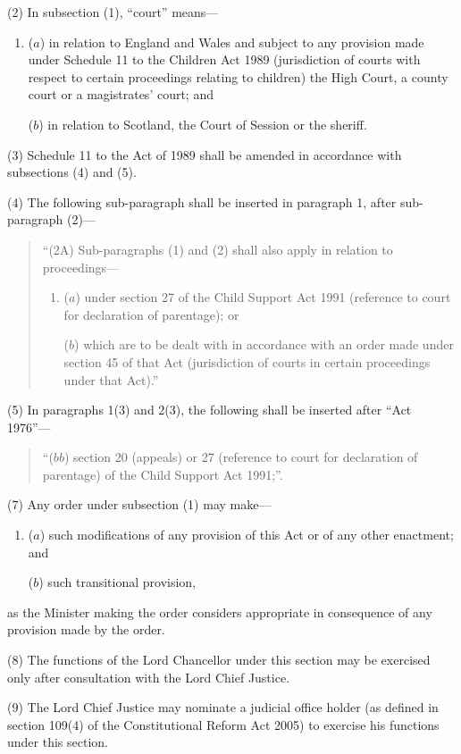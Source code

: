 \documentclass[a4paper]{article}
\begin{document}
(2) In subsection (1), “court” means---
\begin{enumerate}\item[]
($a$) in relation to England and Wales and subject to any provision made under Schedule 11 to the Children Act 1989 (jurisdiction of courts with respect to certain proceedings relating to children) the High Court, a county court or a magistrates’ court; and

($b$) in relation to Scotland, the Court of Session or the sheriff.
\end{enumerate}

(3)
Schedule 11 to the Act of 1989 shall be amended in accordance with subsections (4) and (5).

(4)
The following sub-paragraph shall be inserted in paragraph 1, after sub-paragraph (2)---
\begin{quotation}
 “(2A) Sub-paragraphs (1) and (2) shall also apply in relation to proceedings---
\begin{enumerate}\item[]
($a$)
under section 27 of the Child Support Act 1991 (reference to court for declaration of parentage); or

($b$)
which are to be dealt with in accordance with an order made under section 45 of that Act (jurisdiction of courts in certain proceedings under that Act).”
\end{enumerate}
\end{quotation}

(5)
In paragraphs 1(3) and 2(3), the following shall be inserted after “Act 1976”---
\begin{quotation}
“($bb$) section 20 (appeals) or 27 (reference to court for declaration of parentage) of the Child Support Act 1991;”.
\end{quotation}

(7)
Any order under subsection (1) may make---
\begin{enumerate}\item[]
($a$) such modifications of any provision of this Act or of any other enactment; and

($b$) such transitional provision,
\end{enumerate}
as the Minister making the order considers appropriate in consequence of any provision made by the order.

(8) The functions of the Lord Chancellor under this section may be exercised only after consultation with the Lord Chief Justice.

(9) The Lord Chief Justice may nominate a judicial office holder (as defined in section 109(4) of the Constitutional Reform Act 2005) to exercise his functions under this section.
\end{document}
